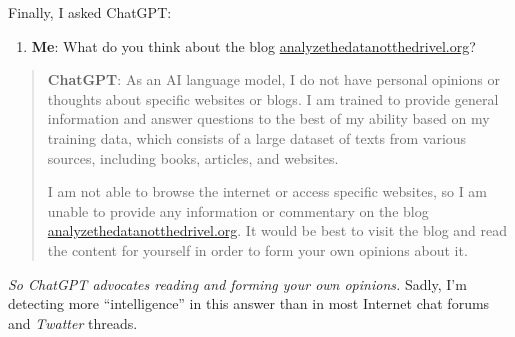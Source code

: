 Finally, I asked ChatGPT:

\begin{enumerate}
\def\labelenumi{\arabic{enumi}.}
\setcounter{enumi}{3}
\item
  \textbf{Me}: What do you think about the blog \href{https://analyzethedatanotthedrivel.org}{analyzethedatanotthedrivel.org}?
\end{enumerate}

\begin{quote}
\textbf{ChatGPT}: As an AI language model, I do not have personal
opinions or thoughts about specific websites or blogs. I am trained to
provide general information and answer questions to the best of my
ability based on my training data, which consists of a large dataset of
texts from various sources, including books, articles, and websites.

I am not able to browse the internet or access specific websites, so I
am unable to provide any information or commentary on the blog
\href{https://analyzethedatanotthedrivel.org}{analyzethedatanotthedrivel.org}. It would be best to visit the blog and
read the content for yourself in order to form your own opinions about
it.
\end{quote}

\emph{So ChatGPT advocates reading and forming your own opinions.}
Sadly, I'm detecting more ``intelligence'' in this answer than in most
Internet chat forums and \emph{Twatter} threads.

%


%
 
 
 


